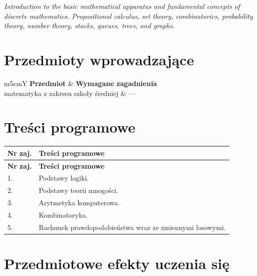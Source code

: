 \documentclass[12pt, a4paper]{article}
\newcommand{\thdrule}{\noalign{\global\setlength{\extrarowheight}{0pt}}}
\newcommand{\thdend}{\noalign{\global\setlength{\extrarowheight}{3pt}}}
\begin{document}
\textit{Introduction to the basic mathematical apparatus and fundamental concepts of discrete mathematics. Propositional calculus, set theory, combinatorics, probability theory, number theory, stacks, queues, trees, and graphs.}


\section{Przedmioty wprowadzające}

{\scriptsize
\begin{tabularx}{\textwidth}{m{5cm}Y}
\thdrule\toprule
{} {\color{white}\textbf{Przedmiot}} & {\color{white}\textbf{Wymagane zagadnienia}} \\
\midrule\thdend
   matematyka z zakresu szkoły średniej & --- \\
\bottomrule
\end{tabularx}}

\section{Treści programowe}

{\scriptsize
\begin{longtable}{m{1.5cm}m{14.5cm}}
\thdrule\toprule
\rowcolor{pjatkRed} {\color{white}\textbf{Nr zaj.}} & {\color{white}\textbf{Treści programowe}} \\
\midrule\thdend
\endfirsthead
\thdrule\toprule
\rowcolor{pjatkRed} {\color{white}\textbf{Nr zaj.}} & {\color{white}\textbf{Treści programowe}} \\
\midrule\thdend
\endhead
  \rowcolor{tableRowLight} 1. & Podstawy logiki. \\
  \rowcolor{tableRowAlt} 2. & Podstawy teorii mnogości. \\
  \rowcolor{tableRowLight} 3. & Arytmetyka komputerowa. \\
  \rowcolor{tableRowAlt} 4. & Kombinatoryka. \\
  \rowcolor{tableRowLight} 5. & Rachunek prawdopodobieństwa wraz ze zmiennymi losowymi. \\
\bottomrule
\end{longtable}}

\section{Przedmiotowe efekty uczenia się}
\end{document}
